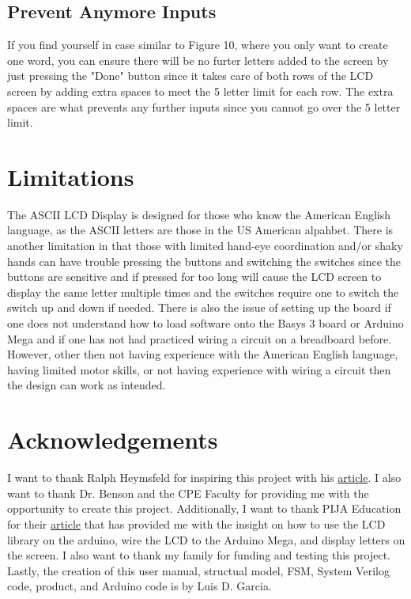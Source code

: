 \documentclass{article}
\begin{document}
\subsection{Prevent Anymore Inputs}
If you find yourself in case similar to Figure 10, where you only want to create one word, you 
can ensure there will be no furter letters added to the screen by just pressing the "Done" button
since it takes care of both rows of the LCD screen by adding extra spaces to meet the 5 letter 
limit for each row. The extra spaces are what prevents any further inputs since you
cannot go over the 5 letter limit.


\section{Limitations}
The ASCII LCD Display is designed for those who know the American English language,
as the ASCII letters are those in the US American alpahbet. There is another 
limitation in that those with limited hand-eye coordination and/or shaky
hands can have trouble pressing the buttons and switching the switches since the buttons 
are sensitive and if pressed for too long will cause the LCD screen to display the 
same letter multiple times and the switches require one to switch the switch up and down
if needed. There is also the issue of setting up the board if one does
not understand how to load software onto the Basys 3 board or Arduino Mega and if one 
has not had practiced wiring a circuit on a breadboard before. However, other then
not having experience with the American English language, having limited motor skills, 
or not having experience with wiring a circuit then the design can work as intended.


\section{Acknowledgements}
I want to thank Ralph Heymsfeld for inspiring this project with his \href{http://robotics.hobbizine.com/fpgalcd.html}{article}.
I also want to thank Dr. Benson and the CPE Faculty for providing me with the opportunity to create this project. 
Additionally, I want to thank PIJA Education for their 
\href{https://pijaeducation.com/arduino/lcd-16x2-with-arduino-uno/print-ascii-characters-on-lcd-16x2-using-arduino/}{article}
that has provided me with the insight on how to use the LCD library on the arduino, wire the LCD to the Arduino Mega, and display letters on the screen.
I also want to thank my family for funding and testing this project. Lastly, the creation of this user manual, structual model, FSM, System Verilog code, product, 
and Arduino code is by Luis D. Garcia.
\end{document}
